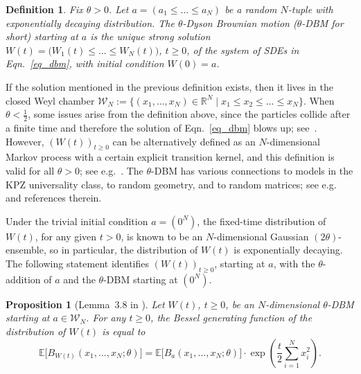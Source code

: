 \documentclass[11pt]{article}
\theoremstyle{plain}
\newtheorem{proposition}[lemma]{Proposition}
\newtheorem{definition}[lemma]{Definition}
\newcommand{\R}{\mathbb R}
\newcommand{\E}{\mathbb E}
\begin{document}
\begin{definition}
    Fix $\theta>0$. Let $a=(a_1\le ...\le a_N)$ be a random $N$-tuple with exponentially decaying distribution. The $\theta$-Dyson Brownian motion ($\theta$-DBM for short) starting at $a$ is the unique strong solution $W(t) = \big(W_1(t)\le ...\le W_N(t)\big)$, $t\ge 0$, of the system of SDEs in Eqn.~\eqref{eq_dbm}, with initial condition $W(0)=a$.
\end{definition}

If the solution mentioned in the previous definition exists, then it lives in the closed Weyl chamber $\mathcal{W}_N := \{(x_1,\dots,x_N)\in\R^N \mid x_1\le x_2\le\dots\le x_N\}$.
When $\theta<\frac{1}{2}$, some issues arise from the definition above, since the particles collide after a finite time and therefore the solution of Eqn.~\eqref{eq_dbm} blows up; see~\cite{CL}.
However, $(W(t))_{t\ge 0}$ can be alternatively defined as an $N$-dimensional Markov process with a certain explicit transition kernel, and this definition is valid for all $\theta>0$; see e.g.~\cite[Eqn. (23)]{GXZ}.
The $\theta$-DBM has various connections to models in the KPZ universality class, to random geometry, and to random matrices; see e.g.~\cite{CH,DOV,Ca,EY} and references therein.

Under the trivial initial condition $a=(0^N)$, the fixed-time distribution of $W(t)$, for any given $t>0$, is known to be an $N$-dimensional Gaussian $(2\theta)$-ensemble, so in particular, the distribution of $W(t)$ is exponentially decaying.
The following statement identifies $(W(t))_{t\ge 0}$, starting at $a$, with the $\theta$-addition of $a$ and the $\theta$-DBM starting at $(0^N)$.



\begin{proposition}[Lemma~3.8 in \cite{GXZ}]\label{prop:dbmbgf}
    Let $W(t)$, $t\ge 0$, be an $N$-dimensional $\theta$-DBM starting at $a\in\mathcal{W}_N$. For any $t\ge 0$, the Bessel generating function of the distribution of $W(t)$ is equal to
    \begin{equation}
        \E\Big[B_{W(t)}(x_{1},...,x_{N};\theta)\Big] = \E\big[B_a(x_{1},...,x_{N};\theta)\big]\cdot \exp\left(\frac{t}{2}\sum_{i=1}^{N}x_{i}^{2}\right).
    \end{equation}
\end{proposition}
\end{document}
